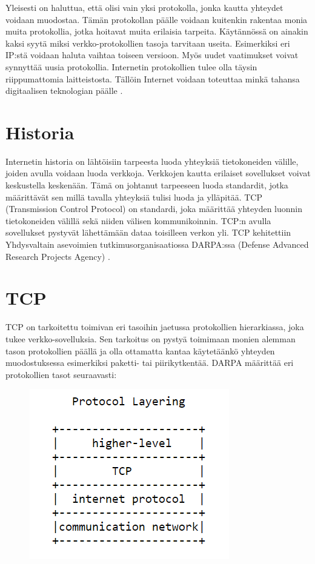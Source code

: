 \documentclass[utf8]{gradu3}
\begin{document}
Yleisesti on haluttua, että olisi vain yksi protokolla, jonka kautta yhteydet voidaan muodostaa. Tämän protokollan päälle voidaan kuitenkin rakentaa monia muita protokollia, jotka hoitavat muita erilaisia tarpeita. Käytännössä on ainakin kaksi syytä miksi verkko-protokollien tasoja tarvitaan useita. Esimerkiksi eri IP:stä voidaan haluta vaihtaa toiseen versioon. Myös uudet vaatimukset voivat synnyttää uusia protokollia. Internetin protokollien tulee olla täysin riippumattomia laitteistosta. Tällöin Internet voidaan toteuttaa minkä tahansa digitaalisen teknologian päälle \parencite{constant_change}.

\section{Historia}
Internetin historia on lähtöisiin tarpeesta luoda yhteyksiä tietokoneiden välille, joiden avulla voidaan luoda verkkoja. Verkkojen kautta erilaiset sovellukset voivat keskustella keskenään. Tämä on johtanut tarpeeseen luoda standardit, jotka määrittävät sen millä tavalla yhteyksiä tulisi luoda ja ylläpitää. TCP (Transmission Control Protocol) on standardi, joka määrittää yhteyden luonnin tietokoneiden välillä sekä niiden välisen kommunikoinnin. TCP:n avulla sovellukset pystyvät lähettämään dataa toisilleen verkon yli. TCP kehitettiin Yhdysvaltain asevoimien tutkimusorganisaatiossa DARPA:ssa (Defense Advanced Research Projects Agency) \parencite{tcp1_1}. 

\section{TCP}
TCP on tarkoitettu toimivan eri tasoihin jaetussa protokollien hierarkiassa, joka tukee verkko-sovelluksia. Sen tarkoitus on pystyä toimimaan monien alemman tason protokollien päällä ja olla ottamatta kantaa käytetäänkö yhteyden muodostuksessa esimerkiksi paketti- tai piirikytkentää.  DARPA määrittää eri protokollien tasot seuraavasti:


\begin{figure}[h]
\centering
\includegraphics[scale=0.85]{protocol_layering.PNG}
\caption{\parencite{tcp1_1}}
\end{figure}
\end{document}

